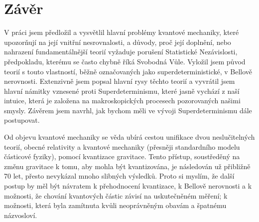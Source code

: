 \section*{Závěr}
\label{sec:conc}

V práci jsem předložil a vysvětlil hlavní problémy kvantové mechaniky, které upozorňují na její vnitřní nesrovnalosti, a důvody, proč její doplnění, nebo nahrazení fundamentálnější teorií vyžaduje porušení Statistické Nezávislosti, předpokladu, kterému se často chybně říká Svobodná Vůle. Vyložil jsem původ teorií s touto vlastností, běžně označovaných jako superdeterministické, v Bellově nerovnosti. Extenzivně jsem popsal hlavní rysy těchto teorií a vyvrátil jsem hlavní námitky vznesené proti Superdeterminismu, které jasně vychází z naší intuice, která je založena na makroskopických procesech pozorovaných našimi smysly. Závěrem jsem navrhl, jak bychom měli ve vývoji Superdeterminismu dále postupovat.

Od objevu kvantové mechaniky se věda ubírá cestou unifikace dvou neslučitelných teorií, obecné relativity a kvantové mechaniky (přesněji standardního modelu částicové fyziky), pomocí kvantizace gravitace. Tento přístup, soustředěný na změnu gravitace k tomu, aby mohla být kvantizována, je následován už přibližně 70 let, přesto nevykázal mnoho slibných výsledků. Proto si myslím, že další postup by měl být návratem k přehodnocení kvantizace, k Bellově nerovnosti a k možnosti, že chování kvantových částic závisí na uskutečněném měření; k možnosti, která byla zamítnuta kvůli neoprávněným obavám a špatnému názvosloví.